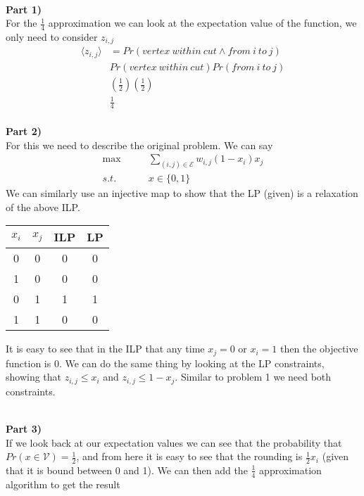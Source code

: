 \documentclass[12pt,letter]{article}
\newcommand{\ppart}[1]{\vspace{2mm}\large\textbf{\\Part {#1})\vspace{2mm}}\normalsize\\}
\begin{document}
\ppart{1}
For the $\frac14$ approximation we can look at the expectation value of the
function, we only need to consider $z_{i,j}$
\begin{align*}
    \langle z_{i,j} \rangle &= Pr(vertex\ within\ cut\wedge from\ i\ to\ j)\\
            & Pr(vertex\ within\ cut)Pr(from\ i\ to\ j)\\
            & \left(\frac12\right)\left(\frac12\right)\\
            & \frac14
\end{align*}
\ppart{2}
\FloatBarrier
For this we need to describe the original problem. We can say
\begin{align*}
    \max\hspace{2em} &\sum\limits_{(i,j)\in\mathcal{E}} w_{i,j}(1-x_i)x_j \\
    s.t. \hspace{2em}& x\in\{0,1\}
\end{align*}
We can similarly use an injective map to show that the LP (given) is a relaxation
of the above ILP.
\begin{figure*}[h!]
    \begin{center}
        \begin{tabular}{|c|c|c|c|}
            \hline
            $x_i$ & $x_j$ & ILP & LP\\
            \hline
            0 & 0 & 0 & 0\\
            \hline
            1 & 0 & 0 & 0\\
            \hline
            0 & 1 & 1 & 1\\
            \hline
            1 & 1 & 0 & 0\\
            \hline
        \end{tabular}
    \end{center}
\end{figure*}
\FloatBarrier
It is easy to see that in the ILP that any time $x_j=0$ or $x_i=1$ then
the objective function is 0. We can do the same thing by looking at the LP
constraints, showing that $z_{i,j}\leq x_i$ and $z_{i,j} \leq 1-x_j$. Similar to 
problem 1 we need both constraints. 

\ppart{3}
If we look back at our expectation values we can see that the probability that
$Pr(x\in\mathcal{V}) = \frac12$, and from here it is easy to see that the rounding
is $\frac12 x_i$ (given that it is bound between 0 and 1). We can then add the 
$\frac14$ approximation algorithm to get the result 
\end{document}
